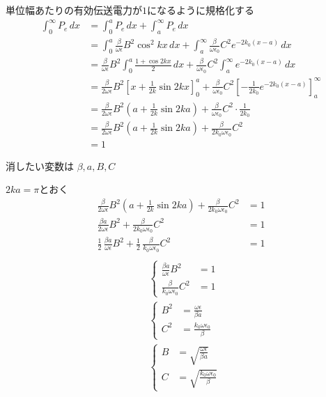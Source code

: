 \documentclass[a4paper,10pt]{bxjsarticle}
\begin{document}
単位幅あたりの有効伝送電力が$1$になるように規格化する
\begin{align*}
    \int_0^\infty P_e \,dx 
    &= \int_0^a P_e \,dx + \int_a^\infty P_e \,dx\\
    &= \int_0^a \frac{\beta}{\omega \epsilon} B^2 \cos^2 kx  \,dx 
     + \int_a^\infty \frac{\beta}{\omega \epsilon_0} C^2 e^{-2k_0(x-a)} \,dx\\
    &= \frac{\beta}{\omega \epsilon} B^2 \int_0^a \frac{1+\cos 2kx}{2}  \,dx 
     + \frac{\beta}{\omega \epsilon_0} C^2 \int_a^\infty  e^{-2k_0(x-a)} \,dx\\
    &= \frac{\beta}{2\omega \epsilon} B^2 \left[ x + \frac{1}{2k} \sin 2kx \right]_0^a 
     + \frac{\beta}{\omega \epsilon_0} C^2 \left[ -\frac{1}{2k_0} e^{-2k_0(x-a)} \right]_a^\infty \\
    &= \frac{\beta}{2\omega \epsilon} B^2 \left( a + \frac{1}{2k} \sin 2ka \right)
     + \frac{\beta}{\omega \epsilon_0} C^2 \cdot \frac{1}{2k_0} \\
    &= \frac{\beta}{2\omega \epsilon} B^2 \left( a + \frac{1}{2k} \sin 2ka \right) + \frac{\beta}{2k_0 \omega \epsilon_0} C^2 \\
    &= 1
\end{align*}

消したい変数は $\beta, a, B, C$

$2ka = \pi$とおく
\begin{align*}
    \frac{\beta}{2\omega \epsilon} B^2 \left( a + \frac{1}{2k} \sin 2ka \right) + \frac{\beta}{2k_0 \omega \epsilon_0} C^2 &= 1 \\
    \frac{\beta a}{2\omega \epsilon} B^2 + \frac{\beta}{2k_0 \omega \epsilon_0} C^2 &= 1 \\
    \frac{1}{2}\,\frac{\beta a}{\omega \epsilon} B^2 + \frac{1}{2}\,\frac{\beta}{k_0\omega\epsilon_0} C^2 &= 1 \\
\end{align*}
\begin{align*}
    &\begin{cases}
        \frac{\beta a}{\omega \epsilon} B^2 &= 1 \\
        \frac{\beta}{k_0\omega\epsilon_0} C^2 &= 1
    \end{cases} \\
    &\begin{cases}
        B^2 &= \frac{\omega \epsilon}{\beta a} \\
        C^2 &= \frac{k_0\omega\epsilon_0}{\beta}
    \end{cases} \\
    &\begin{cases}
        B &= \sqrt{ \frac{\omega \epsilon}{\beta a}  } \\
        C &= \sqrt{ \frac{k_0\omega\epsilon_0}{\beta}} 
    \end{cases} \\
\end{align*}
\end{document}
